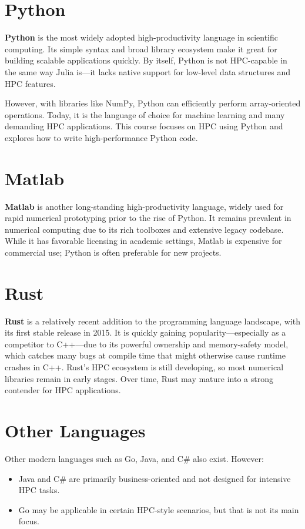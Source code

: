 \documentclass[11pt,a4paper]{book}
\begin{document}
\section{Python}
\textbf{Python} is the most widely adopted high-productivity language in scientific computing. Its simple syntax and broad library ecosystem make it great for building scalable applications quickly. By itself, Python is not HPC-capable in the same way Julia is—it lacks native support for low-level data structures and HPC features.

However, with libraries like NumPy, Python can efficiently perform array-oriented operations. Today, it is the language of choice for machine learning and many demanding HPC applications. This course focuses on HPC using Python and explores how to write high-performance Python code.

\section{Matlab}
\textbf{Matlab} is another long-standing high-productivity language, widely used for rapid numerical prototyping prior to the rise of Python. It remains prevalent in numerical computing due to its rich toolboxes and extensive legacy codebase. While it has favorable licensing in academic settings, Matlab is expensive for commercial use; Python is often preferable for new projects.

\section{Rust}
\textbf{Rust} is a relatively recent addition to the programming language landscape, with its first stable release in 2015. It is quickly gaining popularity—especially as a competitor to C++—due to its powerful ownership and memory-safety model, which catches many bugs at compile time that might otherwise cause runtime crashes in C++. Rust's HPC ecosystem is still developing, so most numerical libraries remain in early stages. Over time, Rust may mature into a strong contender for HPC applications.

\section{Other Languages}
Other modern languages such as Go, Java, and C\# also exist. However:
\begin{itemize}
  \item Java and C\# are primarily business-oriented and not designed for intensive HPC tasks.
  \item Go may be applicable in certain HPC-style scenarios, but that is not its main focus.
\end{itemize}
\end{document}
